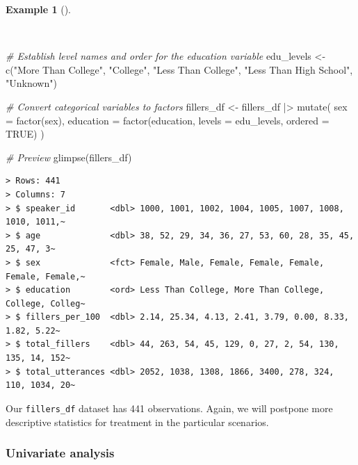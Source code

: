 \documentclass[
  letterpaper,
  DIV=11,
  numbers=noendperiod]{scrreprt}
\newenvironment{Shaded}{\begin{snugshade}}{\end{snugshade}}
\newcommand{\AttributeTok}[1]{\textcolor[rgb]{0.00,0.00,0.00}{#1}}
\newcommand{\CommentTok}[1]{\textcolor[rgb]{0.00,0.00,0.00}{\textit{#1}}}
\newcommand{\ConstantTok}[1]{\textcolor[rgb]{0.00,0.00,0.00}{#1}}
\newcommand{\FunctionTok}[1]{\textcolor[rgb]{0.00,0.00,0.00}{#1}}
\newcommand{\NormalTok}[1]{\textcolor[rgb]{0.00,0.00,0.00}{#1}}
\newcommand{\OtherTok}[1]{\textcolor[rgb]{0.00,0.00,0.00}{#1}}
\newcommand{\SpecialCharTok}[1]{\textcolor[rgb]{0.00,0.00,0.00}{#1}}
\newcommand{\StringTok}[1]{\textcolor[rgb]{0.00,0.00,0.00}{#1}}
\theoremstyle{definition}
\newtheorem{example}{Example}[chapter]
\theoremstyle{remark}
\begin{document}
\begin{example}[]\protect\hypertarget{exm-ida-num-factors}{}\label{exm-ida-num-factors}

~

\begin{Shaded}
\begin{Highlighting}[]
\CommentTok{\# Establish level names and order for the \textasciigrave{}education\textasciigrave{} variable}
\NormalTok{edu\_levels }\OtherTok{\textless{}{-}}
  \FunctionTok{c}\NormalTok{(}\StringTok{"More Than College"}\NormalTok{,}
    \StringTok{"College"}\NormalTok{,}
    \StringTok{"Less Than College"}\NormalTok{,}
    \StringTok{"Less Than High School"}\NormalTok{,}
    \StringTok{"Unknown"}\NormalTok{)}

\CommentTok{\# Convert categorical variables to factors}
\NormalTok{fillers\_df }\OtherTok{\textless{}{-}}
\NormalTok{  fillers\_df }\SpecialCharTok{|\textgreater{}}
  \FunctionTok{mutate}\NormalTok{(}
    \AttributeTok{sex =} \FunctionTok{factor}\NormalTok{(sex),}
    \AttributeTok{education =} \FunctionTok{factor}\NormalTok{(education, }\AttributeTok{levels =}\NormalTok{ edu\_levels, }\AttributeTok{ordered =} \ConstantTok{TRUE}\NormalTok{)}
\NormalTok{  )}

\CommentTok{\# Preview}
\FunctionTok{glimpse}\NormalTok{(fillers\_df)}
\end{Highlighting}
\end{Shaded}

\begin{verbatim}
> Rows: 441
> Columns: 7
> $ speaker_id       <dbl> 1000, 1001, 1002, 1004, 1005, 1007, 1008, 1010, 1011,~
> $ age              <dbl> 38, 52, 29, 34, 36, 27, 53, 60, 28, 35, 45, 25, 47, 3~
> $ sex              <fct> Female, Male, Female, Female, Female, Female, Female,~
> $ education        <ord> Less Than College, More Than College, College, Colleg~
> $ fillers_per_100  <dbl> 2.14, 25.34, 4.13, 2.41, 3.79, 0.00, 8.33, 1.82, 5.22~
> $ total_fillers    <dbl> 44, 263, 54, 45, 129, 0, 27, 2, 54, 130, 135, 14, 152~
> $ total_utterances <dbl> 2052, 1038, 1308, 1866, 3400, 278, 324, 110, 1034, 20~
\end{verbatim}

\end{example}

Our \texttt{fillers\_df} dataset has 441 observations. Again, we will
postpone more descriptive statistics for treatment in the particular
scenarios.

\subsubsection{Univariate analysis}\label{univariate-analysis}
\end{document}

